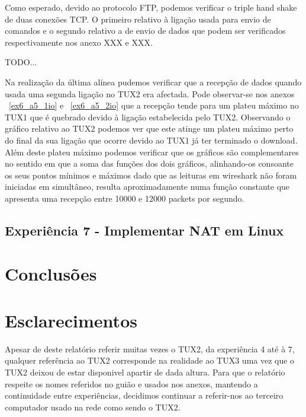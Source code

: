 \documentclass[11pt,a4paper,reqno]{report}
\numberwithin{equation}{section}
\begin{document}
Como esperado, devido ao protocolo FTP, podemos verificar o triple hand shake de duas conexões TCP. O primeiro relativo à ligação usada para envio de comandos e o segundo relativo a de envio de dados que podem ser verificados respectivamente nos anexo XXX e XXX.

TODO...

Na realização da última alínea pudemos verificar que a recepção de dados quando usada uma segunda ligação no TUX2 era afectada. Pode observar-se nos anexos ~\ref{ex6_a5_1io} e ~\ref{ex6_a5_2io} que a recepção  tende para um plateu máximo no TUX1 que é quebrado devido à ligação estabelecida pelo TUX2. Observando o gráfico relativo ao TUX2 podemos ver que este atinge um plateu máximo perto do final da sua ligação que ocorre devido ao TUX1 já ter terminado o download. Além deste plateu máximo podemos verificar que os gráficos são complementares no sentido em que a soma das funções dos dois gráficos, alinhando-os consoante os seus pontos mínimos e máximos dado que as leituras em wireshark não foram iniciadas em simultâneo, resulta aproximadamente numa função constante que apresenta uma recepção entre 10000 e 12000 packets por segundo.

\section{Experiência 7 - Implementar NAT em Linux}

\chapter{Conclusões}

\chapter{Esclarecimentos}

Apesar de deste relatório referir muitas vezes o TUX2, da experiência 4 até à 7, qualquer referência ao TUX2 corresponde na realidade ao TUX3 uma vez que o TUX2 deixou de estar disponivel apartir de dada altura. Para que o relatório respeite os nomes referidos no guião e usados nos anexos, mantendo a continuidade entre experiências, decidimos continuar a referir-nos ao terceiro computador usado na rede como sendo o TUX2.  

\end{document}

